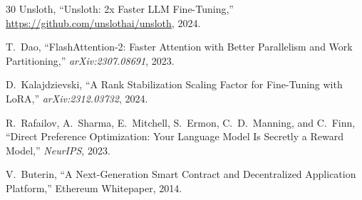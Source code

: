 \documentclass[11pt,letterpaper]{article}
\begin{document}
\begin{thebibliography}{30}
Unsloth, ``Unsloth: 2x Faster LLM Fine-Tuning,'' \url{https://github.com/unslothai/unsloth}, 2024.

T.~Dao, ``FlashAttention-2: Faster Attention with Better Parallelism and Work Partitioning,'' \textit{arXiv:2307.08691}, 2023.

D.~Kalajdzievski, ``A Rank Stabilization Scaling Factor for Fine-Tuning with LoRA,'' \textit{arXiv:2312.03732}, 2024.

R.~Rafailov, A.~Sharma, E.~Mitchell, S.~Ermon, C.~D.~Manning, and C.~Finn, ``Direct Preference Optimization: Your Language Model Is Secretly a Reward Model,'' \textit{NeurIPS}, 2023.

V.~Buterin, ``A Next-Generation Smart Contract and Decentralized Application Platform,'' Ethereum Whitepaper, 2014.

\end{thebibliography}
\end{document}

